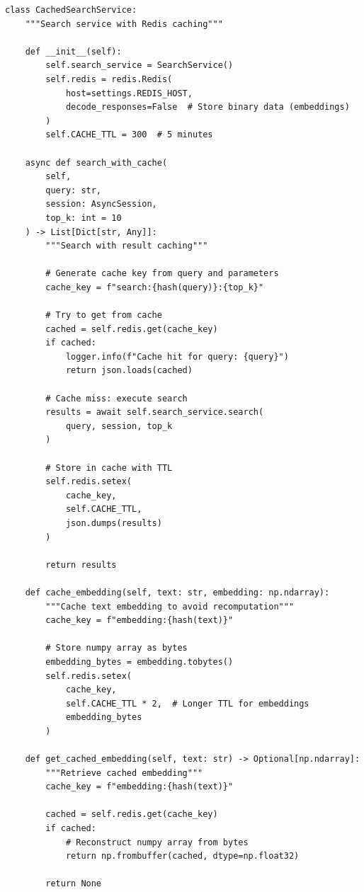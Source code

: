 \begin{lstlisting}
class CachedSearchService:
    """Search service with Redis caching"""
    
    def __init__(self):
        self.search_service = SearchService()
        self.redis = redis.Redis(
            host=settings.REDIS_HOST,
            decode_responses=False  # Store binary data (embeddings)
        )
        self.CACHE_TTL = 300  # 5 minutes
    
    async def search_with_cache(
        self,
        query: str,
        session: AsyncSession,
        top_k: int = 10
    ) -> List[Dict[str, Any]]:
        """Search with result caching"""
        
        # Generate cache key from query and parameters
        cache_key = f"search:{hash(query)}:{top_k}"
        
        # Try to get from cache
        cached = self.redis.get(cache_key)
        if cached:
            logger.info(f"Cache hit for query: {query}")
            return json.loads(cached)
        
        # Cache miss: execute search
        results = await self.search_service.search(
            query, session, top_k
        )
        
        # Store in cache with TTL
        self.redis.setex(
            cache_key,
            self.CACHE_TTL,
            json.dumps(results)
        )
        
        return results
    
    def cache_embedding(self, text: str, embedding: np.ndarray):
        """Cache text embedding to avoid recomputation"""
        cache_key = f"embedding:{hash(text)}"
        
        # Store numpy array as bytes
        embedding_bytes = embedding.tobytes()
        self.redis.setex(
            cache_key,
            self.CACHE_TTL * 2,  # Longer TTL for embeddings
            embedding_bytes
        )
    
    def get_cached_embedding(self, text: str) -> Optional[np.ndarray]:
        """Retrieve cached embedding"""
        cache_key = f"embedding:{hash(text)}"
        
        cached = self.redis.get(cache_key)
        if cached:
            # Reconstruct numpy array from bytes
            return np.frombuffer(cached, dtype=np.float32)
        
        return None
\end{lstlisting}

